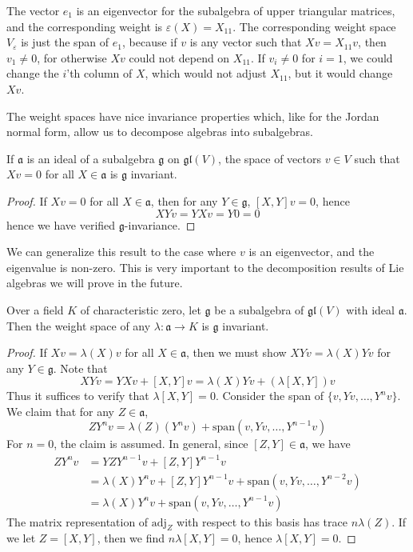 \begin{example}
    The vector $e_1$ is an eigenvector for the subalgebra of upper triangular matrices, and the corresponding weight is $\varepsilon(X) = X_{11}$. The corresponding weight space $V_\varepsilon$ is just the span of $e_1$, because if $v$ is any vector such that $Xv = X_{11}v$, then $v_1 \neq 0$, for otherwise $Xv$ could not depend on $X_{11}$. If $v_i \neq 0$ for $i = 1$, we could change the $i$'th column of $X$, which would not adjust $X_{11}$, but it would change $Xv$.
\end{example}

The weight spaces have nice invariance properties which, like for the Jordan normal form, allow us to decompose algebras into subalgebras.

\begin{lemma}
    If $\mathfrak{a}$ is an ideal of a subalgebra $\mathfrak{g}$ on $\mathfrak{gl}(V)$, the space of vectors $v \in V$ such that $Xv = 0$ for all $X \in \mathfrak{a}$ is $\mathfrak{g}$ invariant.
\end{lemma}
\begin{proof}
    If $Xv = 0$ for all $X \in \mathfrak{a}$, then for any $Y \in \mathfrak{g}$, $[X,Y]v = 0$, hence
    \[ XYv = YXv = Y0 = 0 \]
    hence we have verified $\mathfrak{g}$-invariance.
\end{proof}

We can generalize this result to the case where $v$ is an eigenvector, and the eigenvalue is non-zero. This is very important to the decomposition results of Lie algebras we will prove in the future.

\begin{theorem}
    Over a field $K$ of characteristic zero, let $\mathfrak{g}$ be a subalgebra of $\mathfrak{gl}(V)$ with ideal $\mathfrak{a}$. Then the weight space of any $\lambda: \mathfrak{a} \to K$ is $\mathfrak{g}$ invariant.
\end{theorem}
\begin{proof}
    If $Xv = \lambda(X)v$ for all $X \in \mathfrak{a}$, then we must show $XYv = \lambda(X)Yv$ for any $Y \in \mathfrak{g}$. Note that
    \[ XYv = YXv + [X,Y]v = \lambda(X) Yv + \left( \lambda[X,Y] \right) v \]
    Thus it suffices to verify that $\lambda[X,Y] = 0$. Consider the span of $\{ v, Yv, \dots, Y^nv \}$. We claim that for any $Z \in \mathfrak{a}$,
    \[ ZY^n v = \lambda(Z) (Y^n v) + \text{span}(v,Yv, \dots, Y^{n-1}v) \]
    For $n = 0$, the claim is assumed. In general, since $[Z,Y] \in \mathfrak{a}$, we have
    \begin{align*}
        ZY^nv &= YZY^{n-1}v + [Z,Y]Y^{n-1}v\\
        &= \lambda(X) Y^n v + [Z,Y]Y^{n-1}v + \text{span}(v,Yv, \dots, Y^{n-2}v)\\
        &= \lambda(X) Y^n v + \text{span}(v,Yv, \dots, Y^{n-1}v)
    \end{align*}
    The matrix representation of $\text{adj}_Z$ with respect to this basis has trace $n\lambda(Z)$. If we let $Z = [X,Y]$, then we find $n\lambda[X,Y] = 0$, hence $\lambda[X,Y] = 0$.
\end{proof}

